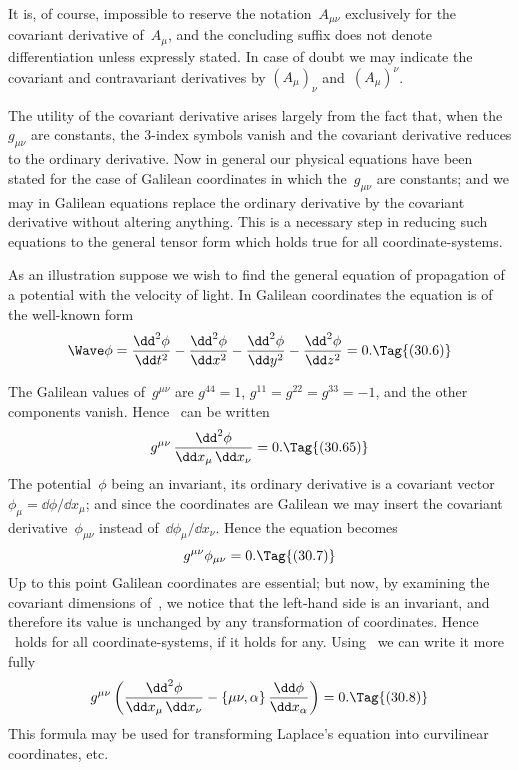 \documentclass[12pt]{book}
\begin{document}
It is, of course, impossible to reserve the notation~$A_{\mu\nu}$ exclusively for the
covariant derivative of~$A_{\mu}$, and the concluding suffix does not denote differentiation
unless expressly stated. In case of doubt we may indicate the covariant
and contravariant derivatives by $(A_{\mu})_{\nu}$ and~$(A_{\mu})^{\nu}$.

The utility of the covariant derivative arises largely from the fact that, when
the~$g_{\mu\nu}$ are constants, the $3$-index symbols vanish and the covariant derivative
reduces to the ordinary derivative. Now in general our physical equations
have been stated for the case of Galilean coordinates in which the~$g_{\mu\nu}$ are
constants; and we may in Galilean equations replace the ordinary derivative
by the covariant derivative without altering anything. This is a necessary
step in reducing such equations to the general tensor form which holds true
for all coordinate\hyp{}systems.

As an illustration suppose we wish to find the general equation of propagation
%
of a potential with the velocity of light. In Galilean coordinates the
equation is of the well-known form
\[
\Wave\phi
  = \frac{\dd^{2} \phi}{\dd t^{2}}
  - \frac{\dd^{2} \phi}{\dd x^{2}}
  - \frac{\dd^{2} \phi}{\dd y^{2}}
  - \frac{\dd^{2} \phi}{\dd z^{2}} = 0.
\Tag{(30.6)}
\]

The Galilean values of~$g^{\mu\nu}$ are $g^{44} = 1$, $g^{11} = g^{22} = g^{33} = -1$, and the other
components vanish. Hence ~can be written
\[
g^{\mu\nu}\, \frac{\dd^{2} \phi}{\dd x_{\mu}\, \dd x_{\nu}} = 0.
\Tag{(30.65)}
\]
The potential~$\phi$ being an invariant, its ordinary derivative is a covariant
vector $\phi_{\mu} = \dd\phi/\dd x_{\mu}$; and since the coordinates are Galilean we may insert
the covariant derivative~$\phi_{\mu\nu}$ instead of~$\dd \phi_{\mu}/\dd x_{\nu}$. Hence the equation becomes
\[
g^{\mu\nu} \phi_{\mu\nu} = 0.
\Tag{(30.7)}
\]
Up to this point Galilean coordinates are essential; but now, by examining the
covariant dimensions of~, we notice that the left-hand side is an invariant,
and therefore its value is unchanged by any transformation of coordinates.
Hence ~holds for all coordinate\hyp{}systems, if it holds for any. Using~
we can write it more fully
\[
g^{\mu\nu} \left(\frac{\dd^{2}\phi}{\dd x_{\mu}\, \dd x_{\nu}} - \{\mu\nu, \alpha\}\, \frac{\dd\phi}{\dd x_{\alpha}}\right) = 0.
\Tag{(30.8)}
\]
This formula may be used for transforming Laplace's equation into curvilinear
coordinates, etc.
\end{document}
